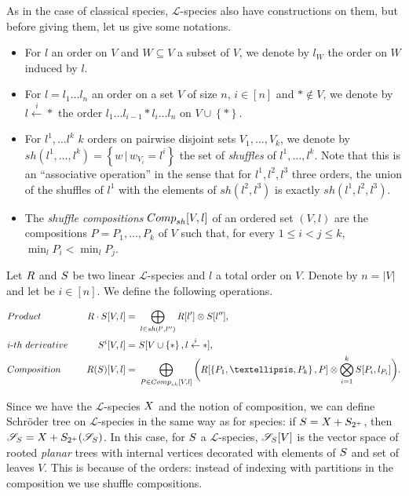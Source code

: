 \documentclass[11pt]{article}
\theoremstyle{definition}
\numberwithin{equation}{section}
\newcommand{\take}{\leftarrow}
\newcommand{\set}[1]{\left\{#1\right\}}
\newcommand{\spe}[1]{\normalfont{\textsc{#1}}}
\newcommand{\card}[1]{|#1|}
\newcommand{\stree}[1]{\mathscr{S}_{{#1}}}
\newcommand{\Comp}{\spe{Comp}}
\begin{document}
As in the case of classical species, $\mathscr{L}$-species also have constructions on them, but before giving them, let us give some notations.
\begin{itemize}
    \item For $l$ an order on $V$ and $W\subseteq V$ a subset of $V$, we denote by $l_W$ the order on $W$ induced by $l$.
    \item For $l=l_1\dots l_n$ an order on a set $V$ of size $n$, $i\in[n]$ and $\ast\not\in V$, we denote by $l\stackrel{i}{\take}\ast$ the order 
    $l_1\dots l_{i-1}\ast l_i\dots l_n$ on $V\cup\set{\ast}$.
    \item For $l^1,\dots l^k$ $k$ orders on pairwise disjoint sets $V_1,\dots, V_k$, we denote by $sh(l^1,\dots,l^k)=\set{w\,|\, w_{V_i}=l^i}$ the set of 
    {\em shuffles} of $l^1,\dots, l^k$. Note that this is an ``associative operation'' in the sense that for $l^1,l^2,l^3$ three orders, the union of
    the shuffles of $l^1$ with the elements of $sh(l^2,l^3)$ is exactly $sh(l^1,l^2,l^3)$.
    \item  The {\em shuffle compositions} $\Comp_{sh}[V,l]$ of an ordered set $(V,l)$ are the compositions $P=P_1,\dots,P_k$ of $V$ such that, for every 
    $1\leq i<j\leq k$, $\min_l P_i<\min_l P_j$.
\end{itemize}

Let $\spe{R}$ and $\spe{S}$ be two linear $\mathscr{L}$-species and $l$ a total order on $V$. Denote by $n=\card{V}$ and let be $i\in[n]$. We define the following operations.

\begin{alignat*}{2}
&Product\quad & \spe{R}\cdot\spe{S}[V,l] = & \ \bigoplus_{l\in sh(l',l'')} \spe{R}[l']\otimes\spe{S}[l''], \\
&i\text{-}th\ derivative\quad & \spe{S}^i[V,l] = & \ \spe{S}[V\cup\set{\ast}, l\stackrel{i}{\take}\ast], \\
&Composition\quad & \spe{R}(\spe{S})[V,l] = & \ \bigoplus_{P\in\Comp_{sh}[V,l]} \bigg(\spe{R}[\set{P_1,\dots,P_k},P]\otimes 
\bigotimes_{i=1}^k \spe{S}[P_i, l_{P_i}]\bigg).
\end{alignat*}

Since we have the $\mathscr{L}$-species $\spe{X}$ and the notion of composition, we can define Schröder tree on $\mathscr{L}$-species in the same way as
for species: if $\spe{S} = \spe{X} + \spe{S}_{2^+}$, then $\stree{\spe{S}} = \spe{X} + \spe{S}_{2^+}(\stree{\spe{S}})$. 
In this case, for $\spe{S}$ a $\mathscr{L}$-species, $\stree{\spe{S}}[V]$ is the vector space of rooted {\em planar} trees with internal vertices decorated 
with elements of $\spe{S}$ and set of leaves $V$.
This is because of the orders: instead of indexing with partitions in the composition we use shuffle compositions.
\end{document}
